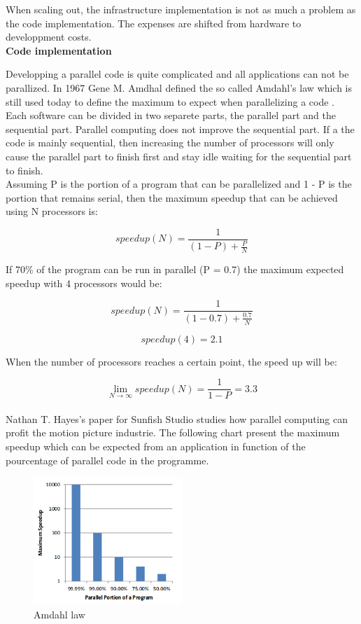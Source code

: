When scaling out, the infrastructure implementation is not as much a problem as
the code implementation. The expenses are shifted from hardware to developpment
costs.\\

\textbf{Code implementation}

Developping a parallel code is quite complicated and all applications can not
be parallized. In 1967 Gene M. Amdhal defined the so called Amdahl's law which
is still used today to define the maximum to expect when parallelizing a code
\citep{Reference10}. \\

Each software can be divided in two separete parts, the parallel part and the
sequential part. Parallel computing does not improve the sequential part. If a
the code is mainly sequential, then increasing the number of processors will
only cause the parallel part to finish first and stay idle waiting for the
sequential part to finish.\\ 

Assuming P is the portion of a program that can be parallelized and 1 - P  is
the portion that remains serial, then the maximum speedup that can be achieved
using N processors is: 

$$speedup(N) = \frac{1}{(1-P) + \frac{P}{N}} $$

If 70\% of the program can be run in parallel (P = 0.7) the maximum expected
speedup with 4 processors would be:

$$speedup(N) = \frac{1}{(1-0.7) + \frac{0.7}{N}}$$

$$speedup(4) = 2.1$$

When the number of processors reaches a certain point, the speed up will be:


$$\lim\limits_{N \to \infty} speedup(N)= \frac{1}{1-P} = 3.3$$\\


Nathan T. Hayes's paper for Sunfish Studio \citep{Reference8} studies how
parallel computing can profit the motion picture industrie. The following chart
present the maximum speedup which can be expected from an application in
function of the pourcentage of parallel code in the programme.\\

\begin{figure}[H] 
  \centering
  \includegraphics[width=0.5\textwidth]{./Figures/amdahl.png}
  \caption[Amdahl law]{Amdahl law \citep{Reference8}} 
  \label{fig:amdahl} 
\end{figure}

